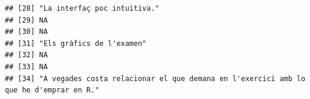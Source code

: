 \documentclass[
]{article}
\begin{document}
\begin{verbatim}
## [28] "La interfaç poc intuitiva."                                                                                                                                                                                                                                                                                                                                                                             
## [29] NA                                                                                                                                                                                                                                                                                                                                                                                                       
## [30] NA                                                                                                                                                                                                                                                                                                                                                                                                       
## [31] "Els gràfics de l'examen"                                                                                                                                                                                                                                                                                                                                                                                
## [32] NA                                                                                                                                                                                                                                                                                                                                                                                                       
## [33] NA                                                                                                                                                                                                                                                                                                                                                                                                       
## [34] "A vegades costa relacionar el que demana en l'exercici amb lo que he d'emprar en R."                                                                                                                                                                                                                                                                                                                    

\end{verbatim}
\end{document}
